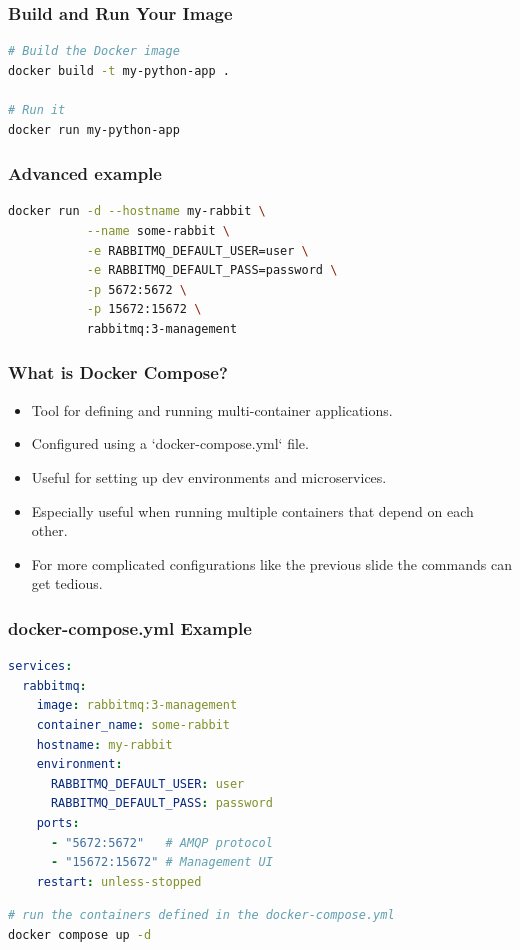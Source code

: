 \documentclass{beamer}
\begin{document}
\begin{frame}[fragile]
\frametitle{Build and Run Your Image}
\begin{lstlisting}[language=bash]
# Build the Docker image
docker build -t my-python-app .

# Run it
docker run my-python-app
\end{lstlisting}
\end{frame}


\begin{frame}[fragile]
\frametitle{Advanced example}
\begin{lstlisting}[language=bash]
docker run -d --hostname my-rabbit \
           --name some-rabbit \
           -e RABBITMQ_DEFAULT_USER=user \
           -e RABBITMQ_DEFAULT_PASS=password \
           -p 5672:5672 \
           -p 15672:15672 \
           rabbitmq:3-management
\end{lstlisting}
\end{frame}

\begin{frame}
\frametitle{What is Docker Compose?}
\begin{itemize}
    \item Tool for defining and running multi-container applications.
    \item Configured using a `docker-compose.yml` file.
    \item Useful for setting up dev environments and microservices.
    \item Especially useful when running multiple containers that depend on each other.
    \item For more complicated configurations like the previous slide the commands can get tedious.
\end{itemize}
\end{frame}

\begin{frame}[fragile]
\frametitle{docker-compose.yml Example}
\begin{lstlisting}[language=yaml]
services:
  rabbitmq:
    image: rabbitmq:3-management
    container_name: some-rabbit
    hostname: my-rabbit
    environment:
      RABBITMQ_DEFAULT_USER: user
      RABBITMQ_DEFAULT_PASS: password
    ports:
      - "5672:5672"   # AMQP protocol
      - "15672:15672" # Management UI
    restart: unless-stopped
\end{lstlisting}

\begin{lstlisting}[language=bash]
# run the containers defined in the docker-compose.yml
docker compose up -d
\end{lstlisting}
\end{frame}
\end{document}
